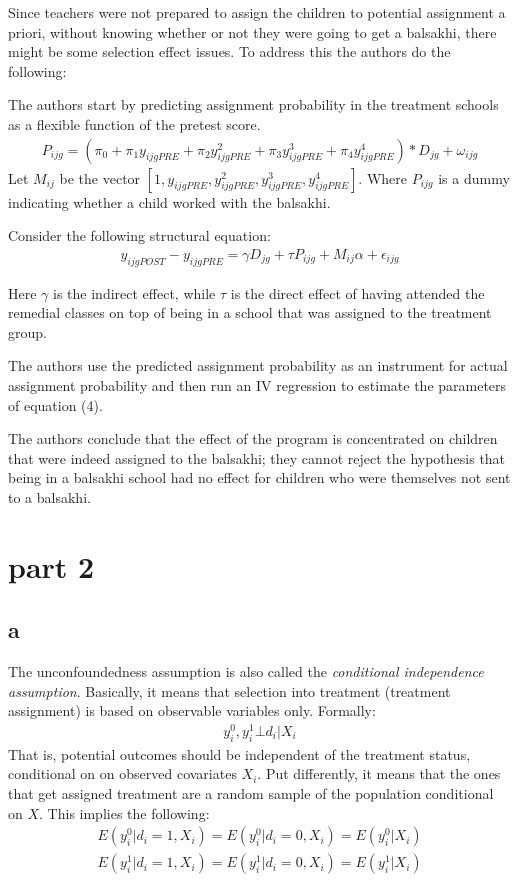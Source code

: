 \documentclass[a4paper]{article}
\begin{document}
Since teachers were not prepared to assign the children to potential assignment a priori, without knowing whether or not they were going to get a balsakhi, there might be some selection effect issues. To address this the authors do the following:

The authors start by predicting assignment probability in the treatment schools as a flexible function of the pretest score.
\begin{align}
P_{ijg}=(\pi_0 +\pi_1 y_{ijgPRE}+\pi_2 y_{ijgPRE}^2 +\pi_3 y_{ijgPRE}^3+\pi_4 y_{ijgPRE}^4)*D_{jg}+\omega_{ijg}
\end{align}
Let $M_{ij}$ be the vector $[1,y_{ijgPRE},y_{ijgPRE}^2,y_{ijgPRE}^3,y_{ijgPRE}^4]$.
Where $P_{ijg}$ is a dummy indicating whether a child worked with the balsakhi. 

Consider the following structural equation:
\begin{align}
y_{ijgPOST}-y_{ijgPRE}=\gamma D_{jg} +\tau P_{ijg} +M_{ij} \alpha +\epsilon_{ijg}
\end{align}

Here $\gamma$ is the indirect effect, while $\tau$ is the direct effect of having attended the remedial classes on top of being in a school that was assigned to the treatment group. 

The authors use the predicted assignment probability as an instrument for actual assignment probability and then run an IV regression to estimate the parameters of equation (4). 

The authors conclude that the effect of the program is concentrated on children that were indeed assigned to the balsakhi; they cannot reject the hypothesis that being in a balsakhi school had no effect for children who were themselves not sent to a balsakhi. 

	\section*{part 2}
	\subsection*{a}
	The unconfoundedness assumption is also called the \textit{conditional independence assumption}. Basically, it means that selection into treatment (treatment assignment) is based on observable variables only. Formally:
	\begin{align}
	y_i^0,y_i^1\bot d_i |X_i
	\end{align}
	That is, potential outcomes should be independent of the treatment status, conditional on on observed covariates $X_i$. Put differently, it means that the ones that get assigned treatment are a random sample of the population conditional on $X$. 
	 This implies the following:
	\begin{align}
	E(y_i^0|d_i=1,X_i)=E(y_i^0|d_i=0,X_i)=E(y_i^0|X_i)\\
	E(y_i^1|d_i=1,X_i)=E(y_i^1|d_i=0,X_i)=E(y_i^1|X_i)
\end{align}
\end{document}
